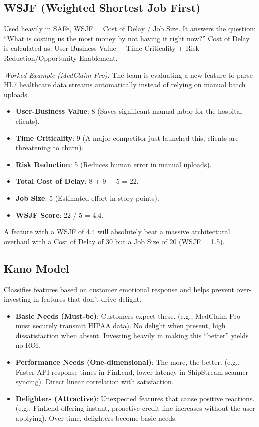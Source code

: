 \documentclass[
  11pt,
  openany,
  oneside]{book}
\providecommand{\tightlist}{%
  \setlength{\itemsep}{0pt}\setlength{\parskip}{0pt}}
\begin{document}
\subsection{WSJF (Weighted Shortest Job
First)}\label{wsjf-weighted-shortest-job-first}

Used heavily in SAFe, WSJF = Cost of Delay / Job Size. It answers the
question: ``What is costing us the most money by not having it right
now?'' Cost of Delay is calculated as: User-Business Value + Time
Criticality + Risk Reduction/Opportunity Enablement.

\emph{Worked Example (MedClaim Pro):} The team is evaluating a new
feature to parse HL7 healthcare data streams automatically instead of
relying on manual batch uploads.

\begin{itemize}
\tightlist
\item
  \textbf{User-Business Value}: 8 (Saves significant manual labor for
  the hospital clients).
\item
  \textbf{Time Criticality}: 9 (A major competitor just launched this,
  clients are threatening to churn).
\item
  \textbf{Risk Reduction}: 5 (Reduces human error in manual uploads).
\item
  \textbf{Total Cost of Delay}: 8 + 9 + 5 = 22.
\item
  \textbf{Job Size}: 5 (Estimated effort in story points).
\item
  \textbf{WSJF Score}: 22 / 5 = 4.4.
\end{itemize}

A feature with a WSJF of 4.4 will absolutely beat a massive
architectural overhaul with a Cost of Delay of 30 but a Job Size of 20
(WSJF = 1.5).

\subsection{Kano Model}\label{kano-model}

Classifies features based on customer emotional response and helps
prevent over-investing in features that don't drive delight.

\begin{itemize}
\tightlist
\item
  \textbf{Basic Needs (Must-be)}: Customers expect these. (e.g.,
  MedClaim Pro must securely transmit HIPAA data). No delight when
  present, high dissatisfaction when absent. Investing heavily in making
  this ``better'' yields no ROI.
\item
  \textbf{Performance Needs (One-dimensional)}: The more, the better.
  (e.g., Faster API response times in FinLend, lower latency in
  ShipStream scanner syncing). Direct linear correlation with
  satisfaction.
\item
  \textbf{Delighters (Attractive)}: Unexpected features that cause
  positive reactions. (e.g., FinLend offering instant, proactive credit
  line increases without the user applying). Over time, delighters
  become basic needs.
\end{itemize}
\end{document}
